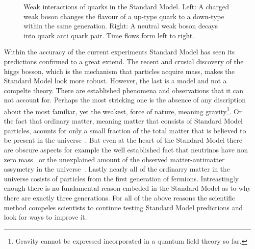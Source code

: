 \begin{figure}[h]
  {\sffamily }
  \caption{Weak interactions of quarks in the Standard Model. Left: A charged weak boson changes the flavour of a up-type quark to a down-type within the same generation.
           Right: A neutral weak boson decays into quark anti quark pair. Time flows form left to right.}
  \label{WeakInteractions}
\end{figure}

Within the accuracy of the current experiments Standard Model has seen its predictions confirmed to a great extend.
The recent and crusial discovery of the higgs bosson, which is the mechanism that particles acquire mass, makes the Standard Model look
more robust. However, the last is a model and not a compelte theory. There are established phenomena and observations that it can not
account for. Perhaps the most stricking one is the absence of any discription about the most familiar, yet the weakest, force of nature,
meaning gravity\footnote{Gravity cannot be expressed incorporated in a quantum field theory so far.}.
Or the fact that ordinary matter, meaning matter that consists of Standard Model particles, acounts for only a small fraction of the total matter
that is believed to be present in the universe~\cite{dmatter-Hinshaw}. But even at the heart of the Standard Model there are obscure aspects for example the well established fact
that neutrinos have non zero mass~\cite{nu-mass-superkam,nu-mass-kamland,nu-mass-sno,nu-mass-daya} or the unexplained amount of the observed
matter-antimatter assymetry in the universe~\cite{more-cpv-huet,more-cpv-gavela_I,more-cpv-gavela_II}.
Lastly nearly all of the ordinarry matter in the universe cosists of
particles from the first generation of fermions. Intreastingly enough there is no fundamental reason embeded in the Standard Model
as to why there are exactly three generations. For all of the above reasons the scientific method compeles scientists to continue
testing Standard Model predictions and look for ways to improve it.
